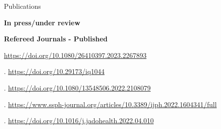 \begin{rSection}{Publications}

\vspace{1em}

\begin{etaremune}
\item {}
\item {}
\item {}
\item {}
\end{etaremune}

\vspace{1em}
{\large \textbf {In press/under review}}
\vspace{1em}

\begin{etaremune}
\item {}
\item {}
\item {}
\item {}
\end{etaremune}

\vspace{1em}
{\large \textbf {Refereed Journals - Published}}
\vspace{1em}

\begin{etaremune}

\item {} \url{https://doi.org/10.1080/26410397.2023.2267893}

\item {}. \url{https://doi.org/10.29173/iq1044}

\item {}. \url{https://doi.org/10.1080/13548506.2022.2108079}

\item {}. \url{https://www.ssph-journal.org/articles/10.3389/ijph.2022.1604341/full}

\item {}. \url{https://doi.org/10.1016/j.jadohealth.2022.04.010}


\end{etaremune}
\end{rSection}
